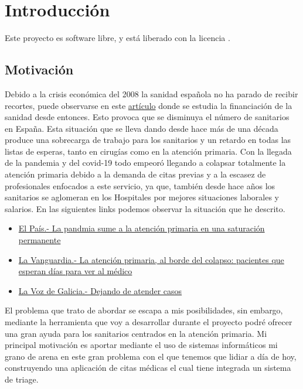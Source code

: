 \chapter{Introducción}

Este proyecto es software libre, y está liberado con la licencia \cite{gplv3}.

\section{Motivación}
Debido a la crisis económica del 2008 la sanidad española no ha parado de recibir recortes, puede observarse en este
\href{https://www.consalud.es/politica/decada-recortes-2009-2018-efectos-infrafinanciacion-sanidad_87083_102.html}{artículo} donde
se estudia la financiación de la sanidad desde entonces. Esto provoca que se disminuya el número de sanitarios en España.
Esta situación que se lleva dando desde hace más de una década produce una sobrecarga de trabajo para los sanitarios y un retardo
en todas las listas de esperas, tanto en cirugías como en la atención primaria.
Con la llegada de la pandemia y del covid-19 todo empeoró llegando a colapsar totalmente la atención primaria debido a la demanda
de citas previas y a la escasez de profesionales enfocados a este servicio, ya que, también desde hace años los sanitarios se aglomeran
en los Hospitales por mejores situaciones laborales y salarios. En las siguientes links podemos observar la situación que he descrito.
\begin{itemize}
    \item \href{https://elpais.com/sociedad/2021-02-08/la-pandemia-sume-a-la-atencion-primaria-en-una-saturacion-permanente.html}{El País.- La pandmia sume a la atención primaria en una saturación permanente}
    \item \href{https://www.lavanguardia.com/vida/20211225/7952109/atencion-primaria-colapso-pacientes-medico-dias-espera.html}{La Vanguardia.- La atención primaria, al borde del colapso: pacientes que esperan días para ver al médico}
    \item \href{https://www.lavozdegalicia.es/noticia/galicia/2022/01/16/dejando-atender-casos/0003_202201G16P2993.htm}{La Voz de Galicia.- Dejando de atender casos}
\end{itemize}
El problema que trato de abordar se escapa a mis posibilidades, sin embargo, mediante la herramienta que voy a desarrollar
durante el proyecto podré ofrecer una gran ayuda para los sanitarios centrados en la atención primaria.
Mi principal motivación es aportar mediante el uso de sistemas informáticos mi grano de arena en este gran problema con el que
tenemos que lidiar a día de hoy, construyendo una aplicación de citas médicas el cual tiene integrada un sistema de triage.


